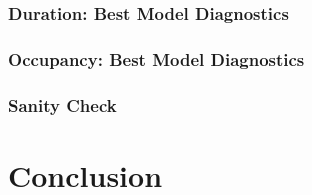 \documentclass{beamer}
\begin{document}
\begin{frame}
\frametitle{Duration: Best Model Diagnostics}
    \begin{center}
        \noindent\centering
        \vspace{-0.7cm}
    \end{center}
\end{frame}

\begin{frame}
\frametitle{Occupancy: Best Model Diagnostics}
    \begin{center}
        \noindent\centering
        \vspace{-0.7cm}
    \end{center}
\end{frame}

\begin{frame}
\frametitle{Sanity Check}
    \vspace{-0.35cm}
    \begin{center}
        
        \vspace{0.1cm} %
        

    \end{center}
\end{frame}

\section{Conclusion}
\end{document}
